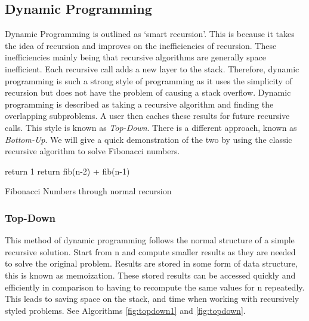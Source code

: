 \documentclass[10pt,twocolumn,hidelinks]{IEEEtran}
\begin{document}
\subsection{Dynamic Programming}
Dynamic Programming is outlined as `smart recursion'. This is because it takes the idea of recursion and improves on the inefficiencies of recursion. These inefficiencies mainly being that recursive algorithms are generally space inefficient. Each recursive call adds a new layer to the stack. Therefore, dynamic programming is such a strong style of programming as it uses the simplicity of recursion but does not have the problem of causing a stack overflow. Dynamic programming  is described as taking a recursive algorithm and finding the overlapping subproblems. A user then caches these results for future recursive calls.
This style is known as \textit{Top-Down}. There is a different approach, known as \textit{Bottom-Up}. We will give a quick demonstration of the two by using the classic recursive algorithm to solve Fibonacci numbers.
\IncMargin{1em}
	\begin{algorithm}
		
		 {return 1\;}
		return fib(n-2) + fib(n-1)\;
			
	\caption{Fibonacci Numbers through normal recursion}
	\end{algorithm}
\DecMargin{1em}
	
	\subsubsection{Top-Down}
	This method of dynamic programming follows the normal structure of a simple recursive solution. Start from n and compute smaller results as they are needed to solve the original problem. Results are stored in some form of data structure, this is known as memoization. These stored results can be accessed quickly and efficiently in comparison to having to recompute the same values for n repeatedly. This leads to saving space on the stack, and time when working with recursively styled problems. See Algorithms \ref{fig:topdown1} and \ref{fig:topdown}.
	
\end{document}
